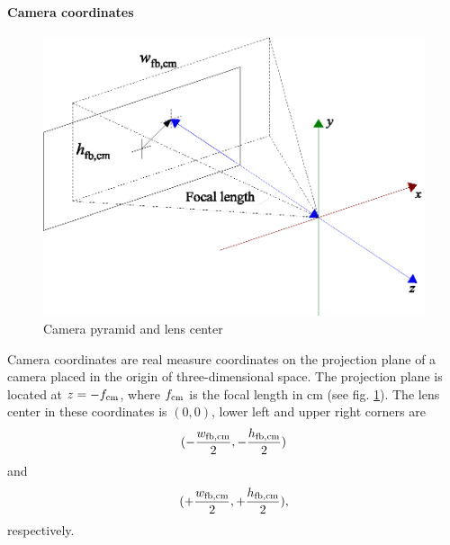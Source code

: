 \documentclass[10pt,a4paper]{article}
\begin{document}
\paragraph{Camera coordinates}
\begin{figure}
\centering
\includegraphics{camera_pyramid_and_lens_center}
\caption{Camera pyramid and lens center}
\label{fig:CameraPyramidAndLensCenter}
\end{figure}
Camera coordinates are real measure coordinates
on the projection plane of a camera placed in
the origin of three-dimensional space.
The projection plane is located at $z=-f_{\mathrm{cm}}$, where $f_{\mathrm{cm}}$
is the focal length in cm (see fig.
\ref{fig:CameraPyramidAndLensCenter}).
The lens center in these coordinates is $(0,0)$, lower left
and upper right corners are
\begin{equation}
(-\frac {w_{\mathrm{fb,cm}}} 2,-\frac {h_{\mathrm{fb,cm}}} 2)
\end{equation}
and
\begin{equation}
(+\frac {w_{\mathrm{fb,cm}}} 2,+\frac {h_{\mathrm{fb,cm}}} 2),
\end{equation}
respectively.

%
\end{document}
